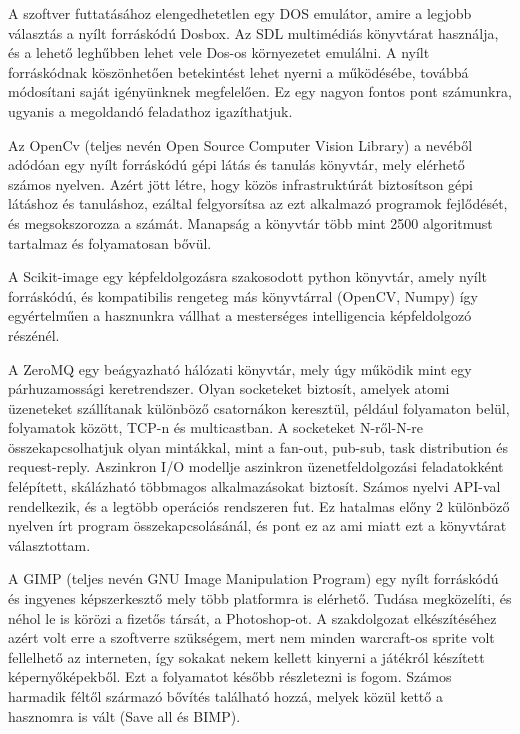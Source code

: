 

A szoftver futtatásához elengedhetetlen egy DOS emulátor, amire a legjobb választás a nyílt forráskódú Dosbox{\cite{dosbox}}. Az SDL multimédiás könyvtárat használja, és a lehető leghűbben lehet vele Dos-os környezetet emulálni. A nyílt forráskódnak köszönhetően betekintést lehet nyerni a működésébe, továbbá módosítani saját igényünknek megfelelően. Ez egy nagyon fontos pont számunkra, ugyanis a megoldandó feladathoz igazíthatjuk.

Az OpenCv{\cite{opencv}} (teljes nevén Open Source Computer Vision Library) a nevéből adódóan egy nyílt forráskódú gépi látás és tanulás könyvtár, mely elérhető számos nyelven. Azért jött létre, hogy közös infrastruktúrát biztosítson gépi látáshoz és tanuláshoz, ezáltal felgyorsítsa az ezt alkalmazó programok fejlődését, és megsokszorozza a számát. Manapság a könyvtár több mint 2500 algoritmust tartalmaz és folyamatosan bővül.


A Scikit-image egy képfeldolgozásra szakosodott python könyvtár, amely nyílt forráskódú, és kompatibilis rengeteg más könyvtárral (OpenCV, Numpy) így egyértelműen a hasznunkra vállhat a mesterséges intelligencia képfeldolgozó részénél.


A ZeroMQ{\cite{zmq}} egy beágyazható hálózati könyvtár, mely úgy működik mint egy párhuzamossági keretrendszer. Olyan socketeket biztosít, amelyek atomi üzeneteket szállítanak különböző csatornákon keresztül, például folyamaton belül, folyamatok között, TCP-n és multicastban. A socketeket N-ről-N-re összekapcsolhatjuk olyan mintákkal, mint a fan-out, pub-sub, task distribution és request-reply. Aszinkron I/O modellje aszinkron üzenetfeldolgozási feladatokként felépített, skálázható többmagos alkalmazásokat biztosít. Számos nyelvi API-val rendelkezik, és a legtöbb operációs rendszeren fut. Ez hatalmas előny 2 különböző nyelven írt program összekapcsolásánál, és pont ez az ami miatt ezt a könyvtárat választottam.

A GIMP (teljes nevén GNU Image Manipulation Program) egy nyílt forráskódú és ingyenes képszerkesztő mely több platformra is elérhető. Tudása megközelíti, és néhol le is körözi a fizetős társát, a Photoshop-ot. A szakdolgozat elkészítéséhez azért volt erre a szoftverre szükségem, mert nem minden warcraft-os sprite volt fellelhető az interneten, így sokakat nekem kellett kinyerni a játékról készített képernyőképekből. Ezt a folyamatot később részletezni is fogom. Számos harmadik féltől származó bővítés található hozzá, melyek közül kettő a hasznomra is vált (Save all{\cite{saveall}} és BIMP{\cite{bimp}}).


